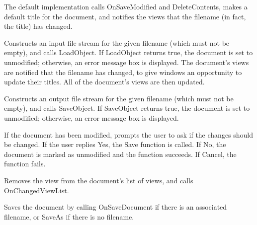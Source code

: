 \label{wxdocumentonnewdocument}


The default implementation calls OnSaveModified and DeleteContents, makes a default title for the
document, and notifies the views that the filename (in fact, the title) has changed.

\label{wxdocumentonopendocument}


Constructs an input file stream for the given filename (which must not be empty),
and calls LoadObject. If LoadObject returns true, the document is set to
unmodified; otherwise, an error message box is displayed. The document's
views are notified that the filename has changed, to give windows an opportunity
to update their titles. All of the document's views are then updated.

\label{wxdocumentonsavedocument}


Constructs an output file stream for the given filename (which must not be empty),
and calls SaveObject. If SaveObject returns true, the document is set to
unmodified; otherwise, an error message box is displayed.

\label{wxdocumentonsavemodified}


If the document has been modified, prompts the user to ask if the changes should
be changed. If the user replies Yes, the Save function is called. If No, the
document is marked as unmodified and the function succeeds. If Cancel, the
function fails.

\label{wxdocumentremoveview}


Removes the view from the document's list of views, and calls OnChangedViewList.

\label{wxdocumentsave}


Saves the document by calling OnSaveDocument if there is an associated filename,
or SaveAs if there is no filename.

